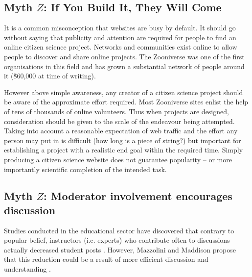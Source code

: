 \documentclass{sigchi}
\begin{document}
\subsection{Myth $Z$: If You Build It, They Will Come}

It is a common misconception that websites are busy by default. It should go without saying that publicity and attention are required for people to find an online citizen science project. Networks and communities exist online to allow people to discover and share online projects. The Zooniverse was one of the first organisations in this field and has grown a substantial network of people around it (\~860,000 at time of writing).

However above simple awareness, any creator of a citizen science project should be aware of the approximate effort required. Most Zooniverse sites enlist the help of tens of thousands of online volunteers. Thus when projects are designed, consideration should be given to the scale of the endeavour being attempted. Taking into account a reasonable expectation of web traffic and the effort any person may put in is difficult (how long is a piece of string?) but important for establishing a project with a realistic end goal within the required time. Simply producing a citizen science website does not guarantee popularity -- or more importantly scientific completion of the intended task.


\subsection{Myth $Z$: Moderator involvement encourages discussion}

Studies conducted in the educational sector have discovered that contrary to popular belief, instructors (i.e. experts) who contribute often to discussions actually decreased student posts \cite{zydney2012creating}. However, Mazzolini and Maddison propose that this reduction could be a result of more efficient discussion and understanding \cite{mazzolini2007jump}. 
\end{document}
